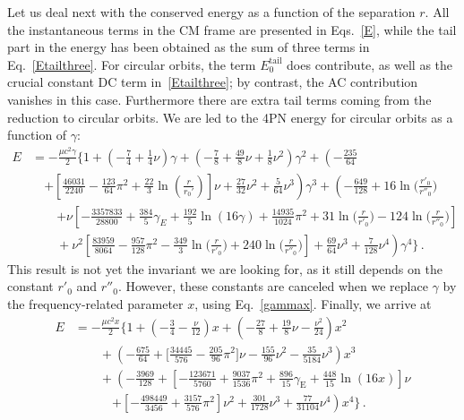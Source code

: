 \documentclass[prd,preprint,superscriptaddress,tightenlines,nofootinbib,
  eqsecnum,showpacs]{revtex4}
\begin{document}
 Let us deal next with the conserved energy as a function of the separation $r$. All
 the instantaneous terms in the CM frame are presented in Eqs.~\eqref{E},
 while the tail
 part in the energy has been obtained as the sum of three terms in
 Eq.~\eqref{Etailthree}. For circular orbits, the term $E_0^\text{tail}$ does
 contribute, as well as the crucial constant DC term in~\eqref{Etailthree}; by
 contrast,
 the AC contribution vanishes in this case. Furthermore there are extra tail terms coming from the reduction to circular orbits. We are led to the 4PN energy for
 circular orbits as a function of $\gamma$:
%
\begin{align}\label{Ecircgam}
E &= -\frac{\mu c^2 \gamma}{2} \biggl\{ 1 + \left( - \frac{7}{4} +
  \frac{1}{4} \nu \right) \gamma + \left( - \frac{7}{8} + \frac{49}{8}
  \nu + \frac{1}{8} \nu^2 \right) \gamma^2  + \left(-\frac{235}{64} \right.
\nonumber\\ & \quad \left.
 + \left[\frac{46031}{2240} - \frac{123}{64}
    \pi^2 + \frac{22}{3} \ln \left( \frac{r}{r_0'} \right) \right] \nu
  + \frac{27}{32} \nu^2 + \frac{5}{64} \nu^3 \right) \gamma^3
 + \left(- \frac{649}{128} 
+ 16 \ln\Big(\frac{r'_0}{r''_0}\Big) \right. \nonumber\\ & \quad \quad \left. 
+ \nu \left[- \frac{3357833}{28800} 
+ \frac{384}{5}\gamma_E + \frac{192}{5}\ln (16 \gamma) 
+ \frac{14935}{1024}\pi^2+ 31 \ln\Big(\frac{r}{r'_{0}}\Big) 
- 124 \ln\Big(\frac{r}{r''_{0}}\Big)\right] \right. \nonumber\\
&\left.  \quad \quad+ \nu^2 \left[\frac{83959}{8064} 
-  \frac{957}{128} \pi^2 -  \frac{349}{3} \ln\Big(\frac{r}{r'_{0}}\Big) 
+ 240 \ln\Big(\frac{r}{r''_{0}}\Big)\right] + \frac{69}{64} \nu^3 
+ \frac{7}{128} \nu^4 \right)\gamma^4 \biggr\} \,.
\end{align}
%
This result is not yet the invariant we are looking for, as it still depends
on the constant $r'_0$ and $r''_0$. However, these constants are canceled when
we replace $\gamma$ by the frequency-related parameter $x$, using
Eq.~\eqref{gammax}. Finally, we arrive at~\cite{DJS14, DJS16, BBBFMa, BBBFMb, FSrevue}
%
\begin{align}\label{Ecirc}
	E &= -\frac{\mu c^2 x}{2} \biggl\{ 1 + \left( - \frac{3}{4} -
        \frac{\nu}{12} \right) x + \left( - \frac{27}{8} +
        \frac{19}{8} \nu - \frac{\nu^2}{24} \right) x^2 \nonumber
        \\ &\quad\quad + \left( - \frac{675}{64} + \biggl[
          \frac{34445}{576} - \frac{205}{96} \pi^2 \biggr] \nu -
        \frac{155}{96} \nu^2 - \frac{35}{5184} \nu^3 \right) x^3
        \nonumber \\ &\quad\quad + \left( - \frac{3969}{128} +
        \left[-\frac{123671}{5760}+\frac{9037}{1536}\pi^2 +
          \frac{896}{15}\gamma_\text{E}+ \frac{448}{15} \ln(16
          x)\right]\nu\right.\nonumber\\ & \quad\quad\quad \left.+
        \left[-\frac{498449}{3456}+\frac{3157}{576}\pi^2\right]\nu^2
        +\frac{301}{1728}\nu^3 + \frac{77}{31104}\nu^4\right) x^4
        \biggr\} \,.
\end{align}
\end{document}
